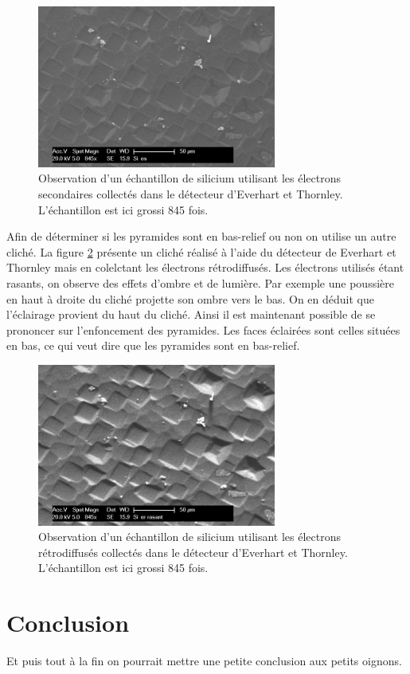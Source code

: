 \documentclass[a4paper,12pt]{article}
\newcommand\ett{Everhart et Thornley\xspace}
\begin{document}
\begin{figure}
\centering
\includegraphics[width=0.7\textwidth]{images/si_es.png}
\caption{Observation d'un échantillon de silicium utilisant les électrons secondaires collectés dans le détecteur d'\ett. L'échantillon est ici grossi 845 fois.}
\label{fig:si_es}
\end{figure}

Afin de déterminer si les pyramides sont en bas-relief ou non on utilise un autre cliché. La figure \ref{fig:si_er_rasant} présente
un cliché réalisé à l'aide du détecteur de \ett mais en colelctant les électrons rétrodiffusés. Les électrons utilisés étant rasants,
on observe des effets d'ombre et de lumière. Par exemple une poussière en haut à droite du cliché projette son ombre vers le bas.
On en déduit que l'éclairage provient du haut du cliché. Ainsi il est maintenant possible de se prononcer sur l'enfoncement des pyramides.
Les faces éclairées sont celles situées en bas, ce qui veut dire que les pyramides sont en bas-relief.

\begin{figure}
\centering
\includegraphics[width=0.7\textwidth]{images/si_er_rasant.png}
\caption{Observation d'un échantillon de silicium utilisant les électrons rétrodiffusés collectés dans le détecteur d'\ett. L'échantillon est ici grossi 845 fois.}
\label{fig:si_er_rasant}
\end{figure}


\section*{Conclusion}

Et puis tout à la fin on pourrait mettre une petite conclusion aux petits oignons.
\end{document}
